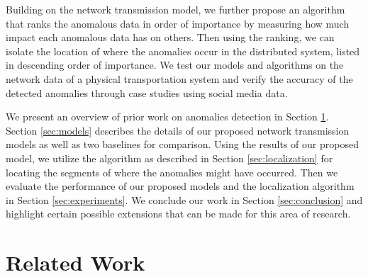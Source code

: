\documentclass[conference]{IEEEtran.1.8}
\begin{document}
Building on the network transmission model, we further propose an algorithm that ranks the anomalous data in order of importance by measuring how much impact each anomalous data has on others. Then using the ranking, we can isolate the location of where the anomalies occur in the distributed system, listed in descending order of importance. We test our models and algorithms on the network data of a physical transportation system and verify the accuracy of the detected anomalies through case studies using social media data.


We present an overview of prior work on anomalies detection in Section \ref{sec:related}. Section \ref{sec:models} describes the details of our proposed network transmission models as well as two baselines for comparison. Using the results of our proposed model, we utilize the algorithm as described in Section \ref{sec:localization} for locating the segments of where the anomalies might have occurred. Then we evaluate the performance of our proposed models and the localization algorithm in Section \ref{sec:experiments}. We conclude our work in Section \ref{sec:conclusion} and highlight certain possible extensions that can be made for this area of research.


\section{Related Work}
\label{sec:related}


\end{document}
